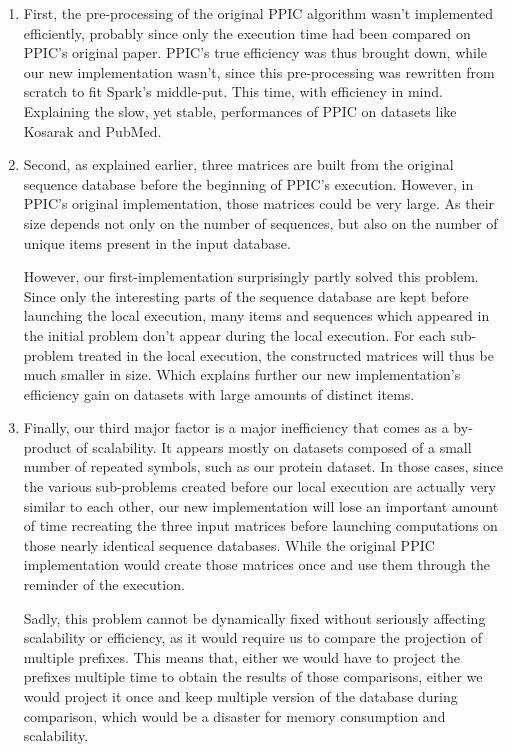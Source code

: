 \documentclass{eplmastersthesis}
\begin{document}
\begin{enumerate}
\item First, the pre-processing of the original PPIC algorithm wasn't implemented efficiently, probably since only the execution time had been compared on PPIC's original paper. PPIC's true efficiency was thus brought down, while our new implementation wasn't, since this pre-processing was rewritten from scratch to fit Spark's middle-put. This time, with efficiency in mind. Explaining the slow, yet stable, performances of PPIC on datasets like Kosarak and PubMed.

\item Second, as explained earlier, three matrices are built from the original sequence database before the beginning of PPIC's execution. However, in PPIC's original implementation, those matrices could be very large. As their size depends not only on the number of sequences, but also on the number of unique items present in the input database. \newline
	
	However, our first-implementation surprisingly partly solved this problem. Since only the interesting parts of the sequence database are kept before launching the local execution, many items and sequences which appeared in the initial problem don't appear during the local execution. For each sub-problem treated in the local execution, the constructed matrices will thus be much smaller in size. Which explains further our new implementation's efficiency gain on datasets with large amounts of distinct items.
	
\item Finally, our third major factor is a major inefficiency that comes as a by-product of scalability. It appears mostly on datasets composed of a small number of repeated symbols, such as our protein dataset. In those cases, since the various sub-problems created before our local execution are actually very similar to each other, our new implementation will lose an important amount of time recreating the three input matrices before launching computations on those nearly identical sequence databases. While the original PPIC implementation would create those matrices once and use them through the reminder of the execution. \newline

Sadly, this problem cannot be dynamically fixed without seriously affecting scalability or efficiency, as it would require us to compare the projection of multiple prefixes. This means that, either we would have to project the prefixes multiple time to obtain the results of those comparisons, either we would project it once and keep multiple version of the database during comparison, which would be a disaster for memory consumption and scalability.\newline


\end{enumerate}
\end{document}

